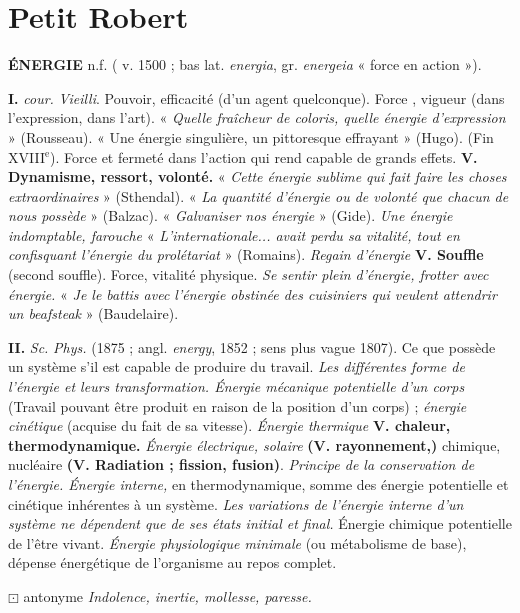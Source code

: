 \section{Petit Robert}

{\bf ÉNERGIE} {\sf n.f.} ( v. 1500 ; bas lat. {\it energia}, gr. {\it energeia} « force en action »).

{\bf I.} {\it cour.}  {\it Vieilli}. Pouvoir, efficacité (d'un agent quelconque). \lb Force , vigueur (dans l'expression, dans l'art). « {\it Quelle fraîcheur de coloris, quelle énergie d'expression} » ({\sc Rousseau}). « Une énergie singulière, un pittoresque effrayant » ({\sc Hugo}).
%
(Fin {\footnotesize XVIII}$^\text{e}$). Force et fermeté dans l'action qui rend capable de grands effets. {\bf V. Dynamisme, ressort, volonté.} « {\it Cette énergie sublime qui fait faire les choses extraordinaires} » ({\sc Sthendal}). « {\it La quantité d'énergie ou de volonté que chacun de nous possède} » ({\sc Balzac}). « {\it Galvaniser nos énergie} » ({\sc Gide}). {\it Une énergie indomptable, farouche} « {\it L'internationale... avait perdu sa vitalité, tout en confisquant l'énergie du prolétariat} » ({\sc Romains}). {\it Regain d'énergie} {\bf V. Souffle} (second souffle). \lb Force, vitalité physique. {\it Se sentir plein d'énergie, frotter avec énergie.} « {\it Je le battis avec l'énergie obstinée des cuisiniers qui veulent attendrir un beafsteak} » ({\sc Baudelaire}).

{\bf II.} {\it Sc.}  {\it Phys.} (1875 ; angl. {\it energy}, 1852 ; sens plus vague 1807). Ce que possède un système s'il est capable de produire du travail. {\it Les différentes forme de l'énergie et leurs transformation. Énergie mécanique potentielle d'un corps} (Travail pouvant être produit en raison de la position d'un corps) ; {\it énergie cinétique} (acquise du fait de sa vitesse). {\it Énergie thermique} {\bf V. chaleur, thermodynamique.} {\it Énergie électrique, solaire} {\bf (V. rayonnement,)} chimique, nucléaire  {\bf (V. Radiation ; fission, fusion)}. {\it Principe de la conservation de l'énergie. Énergie interne,} en thermodynamique, somme des énergie potentielle et cinétique inhérentes à un système. {\it Les variations de l'énergie interne d'un système ne dépendent que de ses états initial et final.}  Énergie chimique potentielle de l'être vivant. {\it Énergie physiologique minimale} (ou métabolisme de base), dépense énergétique de l'organisme au repos complet.

$\boxdot$ {\sc antonyme} \textit{\textsf{Indolence, inertie, mollesse, paresse.}}

